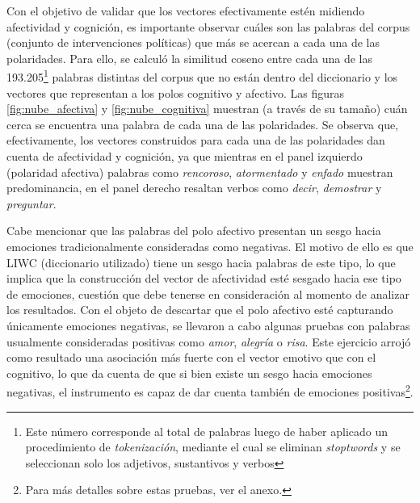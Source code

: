 \documentclass[
  12pt,
]{article}
\begin{document}
Con el objetivo de validar que los vectores efectivamente estén midiendo
afectividad y cognición, es importante observar cuáles son las palabras
del corpus (conjunto de intervenciones políticas) que más se acercan a
cada una de las polaridades. Para ello, se calculó la similitud coseno
entre cada una de las
193.205\footnote{Este número corresponde al total de palabras luego de haber aplicado un procedimiento de \textit{tokenización}, mediante el cual se eliminan \textit{stoptwords} y se seleccionan solo los adjetivos, sustantivos y verbos}
palabras distintas del corpus que no están dentro del diccionario y los
vectores que representan a los polos cognitivo y afectivo. Las figuras
\ref{fig:nube_afectiva} y \ref{fig:nube_cognitiva} muestran (a través de
su tamaño) cuán cerca se encuentra una palabra de cada una de las
polaridades. Se observa que, efectivamente, los vectores construidos
para cada una de las polaridades dan cuenta de afectividad y cognición,
ya que mientras en el panel izquierdo (polaridad afectiva) palabras como
\emph{rencoroso}, \emph{atormentado} y \emph{enfado} muestran
predominancia, en el panel derecho resaltan verbos como \emph{decir},
\emph{demostrar} y \emph{preguntar}.

Cabe mencionar que las palabras del polo afectivo presentan un sesgo
hacia emociones tradicionalmente consideradas como negativas. El motivo
de ello es que LIWC (diccionario utilizado) tiene un sesgo hacia
palabras de este tipo, lo que implica que la construcción del vector de
afectividad esté sesgado hacia ese tipo de emociones, cuestión que debe
tenerse en consideración al momento de analizar los resultados. Con el
objeto de descartar que el polo afectivo esté capturando únicamente
emociones negativas, se llevaron a cabo algunas pruebas con palabras
usualmente consideradas positivas como \emph{amor}, \emph{alegría} o
\emph{risa}. Este ejercicio arrojó como resultado una asociación más
fuerte con el vector emotivo que con el cognitivo, lo que da cuenta de
que si bien existe un sesgo hacia emociones negativas, el instrumento es
capaz de dar cuenta también de emociones
positivas\footnote{Para más detalles sobre estas pruebas, ver el anexo.}.
\end{document}
